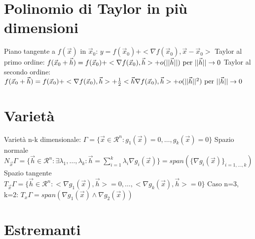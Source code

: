 \documentclass[]{article}
\newcommand{\ux}{\vec{x}}
\newcommand{\uh}{\vec{h}}
\begin{document}
\section{Polinomio di Taylor in più dimensioni}

Piano tangente a \(f(\ux)\) in \(\ux_0\): \(y=f(\ux_0)+<\nabla f(\ux_0),\ux-\ux_0>\) \newline
Taylor al primo ordine: \(f(\ux_0+\uh)=f(\ux_0)+<\nabla f(\ux_0),\uh>+o(||\uh||) \textnormal{ per } ||\uh||\to 0\)\newline
Taylor al secondo ordine: \(f(\ux_0+\uh)=f(\ux_0)+<\nabla f(\ux_0),\uh>+\frac{1}{2}<\uh\nabla f(\ux_0),\uh>+o(||\uh||^2) \textnormal{ per } ||\uh||\to 0\)\newline

\section{Varietà}
Varietà n-k dimensionale: \(\Gamma=\{\ux\in\mathcal{R}^n : g_1(\ux)=0,\dots,g_k(\ux)=0\}\) \newline
Spazio normale \(N_{\ux}\Gamma=\{\uh\in\mathcal{R}^n : \exists \lambda_1,\dots,\lambda_k : \uh=\sum_{i=1}^{k}\lambda_i\nabla g_i(\ux)\}=span(\{\nabla g_i(\ux)\}_{i=1,\dots,k})\) \newline
Spazio tangente \(T_{\ux}\Gamma=\{\uh\in\mathcal{R}^n : <\nabla g_1(\ux),\uh>=0,\dots,<\nabla g_k(\ux),\uh>=0\}\) \newline
Caso n=3, k=2: \(T_x\Gamma=span(\nabla g_1(\ux)\wedge\nabla g_2(\ux))\)

\section{Estremanti}
\end{document}
